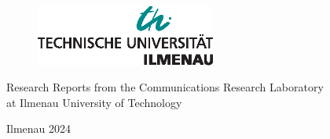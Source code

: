 \begin{titlepage}
    \pagestyle{empty}
    \centering \sffamily \Large
    
    \begin{flushright}
        \begin{figure}[ht]
            \flushright
            \includegraphics[height=2cm]{./_template/tui_logos/TU_Ilmenau_Logo_black_green.eps}
        \end{figure}
    \end{flushright}
    
    \myrule 
    
    Research Reports from the Communications Research Laboratory \\
    at Ilmenau University of Technology
    
    
    \myrule 
    
    \vspace{3cm}
    
    {\Huge \bfseries \singlespacing \phdtitle \par}
    
    \vspace{3cm}
    
    {\LARGE \slshape \authorname}
    
    \vfill
    
    Ilmenau 2024

    \myrule

\end{titlepage}